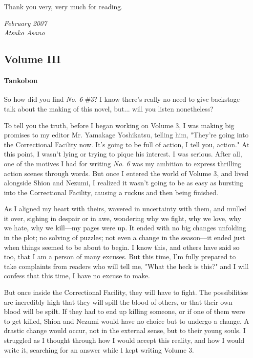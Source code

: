 Thank you very, very much for reading.

\myspace

\emph{February 2007\\
Atsuko Asano}

\subsection{Volume III}
\paragraph{Tankobon}

So how did you find \emph{No. 6} \#3? I know there's really no need to give
backstage-talk about the making of this novel, but... will you listen
nonetheless?

To tell you the truth, before I began working on Volume 3, I was making
big promises to my editor Mr. Yamakage Yoshikatsu, telling him, "They're
going into the Correctional Facility now. It's going to be full of
action, I tell you, action." At this point, I wasn't lying or trying to
pique his interest. I was serious. After all, one of the motives I had
for writing \emph{No. 6} was my ambition to express thrilling action scenes
through words. But once I entered the world of Volume 3, and lived
alongside Shion and Nezumi, I realized it wasn't going to be as easy as
bursting into the Correctional Facility, causing a ruckus and then being
finished.

As I aligned my heart with theirs, wavered in uncertainty with them, and
mulled it over, sighing in despair or in awe, wondering why we fight,
why we love, why we hate, why we kill---my pages were up. It ended with no
big changes unfolding in the plot; no solving of puzzles; not even a
change in the season---it ended just when things seemed to be about to
begin. I know this, and others have said so too, that I am a person of
many excuses. But this time, I'm fully prepared to take complaints from
readers who will tell me, "What the heck is this?" and I will confess
that this time, I have no excuse to make.

But once inside the Correctional Facility, they will have to fight. The
possibilities are incredibly high that they will spill the blood of
others, or that their own blood will be spilt. If they had to end up
killing someone, or if one of them were to get killed, Shion and Nezumi
would have no choice but to undergo a change. A drastic change would
occur, not in the external sense, but to their young souls. I struggled
as I thought through how I would accept this reality, and how I would
write it, searching for an answer while I kept writing Volume 3.

